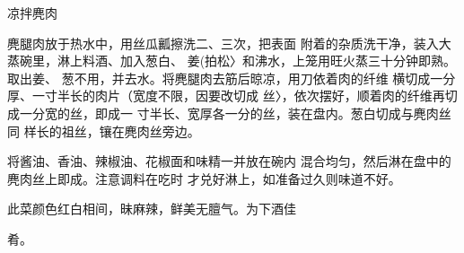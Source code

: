 \begin{recipe}{凉拌麂肉}

\ingredients


\cooking

\step 	麂腿肉放于热水中，用丝瓜瓤擦洗二、三次，把表面 附着的杂质洗干净，装入大蒸碗里，淋上料酒、加入葱白、 姜(拍松〉和沸水，上笼用旺火蒸三十分钟即熟。取出姜、 葱不用，并去水。将麂腿肉去筋后晾凉，用刀依着肉的纤维 横切成一分厚、一寸半长的肉片（宽度不限，因要改切成 丝〉，依次摆好，顺着肉的纤维再切成一分宽的丝，即成一 寸半长、宽厚各一分的丝，装在盘内。葱白切成与麂肉丝同 样长的祖丝，镶在麂肉丝旁边。

\step 	将酱油、香油、辣椒油、花椒面和味精一并放在碗内 混合均匀，然后淋在盘中的麂肉丝上即成。注意调料在吃时 才兑好淋上，如准备过久则味道不好。

\notes

此菜颜色红白相间，昧麻辣，鲜美无膻气。为下酒佳

肴。

\end{recipe}

